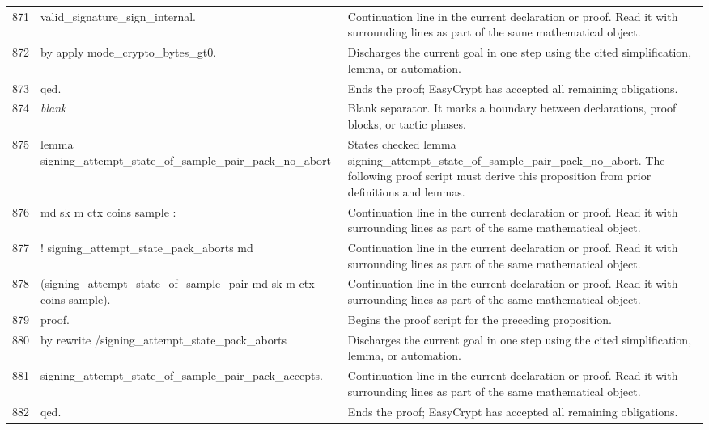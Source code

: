 \documentclass[10pt]{article}
\begin{document}
\begin{longtable}{r L{0.53\textwidth} L{0.37\textwidth}}
871 & {\ttfamily\scriptsize              valid\_signature\_sign\_internal.} & Continuation line in the current declaration or proof.  Read it with surrounding lines as part of the same mathematical object. \\
872 & {\ttfamily\scriptsize by apply mode\_crypto\_bytes\_gt0.} & Discharges the current goal in one step using the cited simplification, lemma, or automation. \\
873 & {\ttfamily\scriptsize qed.} & Ends the proof; EasyCrypt has accepted all remaining obligations. \\
874 & {\ttfamily\scriptsize \emph{blank}} & Blank separator.  It marks a boundary between declarations, proof blocks, or tactic phases. \\
875 & {\ttfamily\scriptsize lemma signing\_attempt\_state\_of\_sample\_pair\_pack\_no\_abort} & States checked lemma signing\_attempt\_state\_of\_sample\_pair\_pack\_no\_abort.  The following proof script must derive this proposition from prior definitions and lemmas. \\
876 & {\ttfamily\scriptsize   md sk m ctx coins sample :} & Continuation line in the current declaration or proof.  Read it with surrounding lines as part of the same mathematical object. \\
877 & {\ttfamily\scriptsize   ! signing\_attempt\_state\_pack\_aborts md} & Continuation line in the current declaration or proof.  Read it with surrounding lines as part of the same mathematical object. \\
878 & {\ttfamily\scriptsize       (signing\_attempt\_state\_of\_sample\_pair md sk m ctx coins sample).} & Continuation line in the current declaration or proof.  Read it with surrounding lines as part of the same mathematical object. \\
879 & {\ttfamily\scriptsize proof.} & Begins the proof script for the preceding proposition. \\
880 & {\ttfamily\scriptsize by rewrite /signing\_attempt\_state\_pack\_aborts} & Discharges the current goal in one step using the cited simplification, lemma, or automation. \\
881 & {\ttfamily\scriptsize            signing\_attempt\_state\_of\_sample\_pair\_pack\_accepts.} & Continuation line in the current declaration or proof.  Read it with surrounding lines as part of the same mathematical object. \\
882 & {\ttfamily\scriptsize qed.} & Ends the proof; EasyCrypt has accepted all remaining obligations. \\

\end{longtable}
\end{document}
